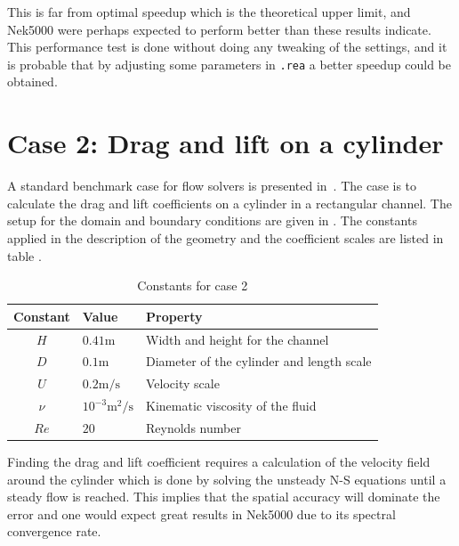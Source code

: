 This is far from optimal speedup which is the theoretical upper limit, and Nek5000 were perhaps expected to perform 
better than these results indicate. This performance test is done without doing any tweaking of the settings, and 
it is probable that by adjusting some parameters in \verb|.rea| a better speedup could be obtained. 



\section{Case 2: Drag and lift on a cylinder}
A standard benchmark case for flow solvers is presented in~\cite{benchmark}. 
The case is to calculate the drag and lift coefficients on a cylinder in a rectangular channel.
The setup for the domain and boundary conditions are given in .
The constants applied in the description of the geometry and the coefficient scales are listed 
in table .
%
\begin{table}[h]
    \centering
    \begin{tabular}{c l l}
     Constant & Value & Property \\ \hline
    $H$ & $0.41\text{m}$ & Width and height for the channel \\
    $D$ & $0.1\text{m}$ & Diameter of the cylinder and length scale \\
    $U$ & $0.2\text{m/s}$ & Velocity scale \\
    $\nu$ &  $ 10^{-3}\text{m$^2$/s}$ & Kinematic viscosity of the fluid \\
    $Re$ & $20$ & Reynolds number \\ 
    \end{tabular}
    \caption{Constants for case 2}
    \label{tab:case2consts}
\end{table}
%
Finding the drag and lift coefficient requires a calculation of the velocity field around the cylinder
which is done by solving the unsteady N-S equations until a steady flow is reached. This implies that the
spatial accuracy will dominate the error and one would expect great results in Nek5000 
due to its spectral convergence rate.

